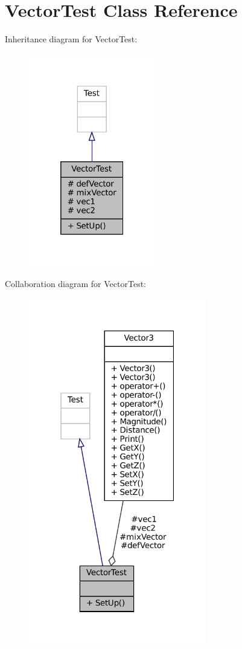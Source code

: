 \hypertarget{classVectorTest}{}\section{Vector\+Test Class Reference}
\label{classVectorTest}


Inheritance diagram for Vector\+Test\+:
\nopagebreak
\begin{figure}[H]
\begin{center}
\leavevmode
\includegraphics[width=157pt]{classVectorTest__inherit__graph}
\end{center}
\end{figure}


Collaboration diagram for Vector\+Test\+:
\nopagebreak
\begin{figure}[H]
\begin{center}
\leavevmode
\includegraphics[width=220pt]{classVectorTest__coll__graph}
\end{center}
\end{figure}
